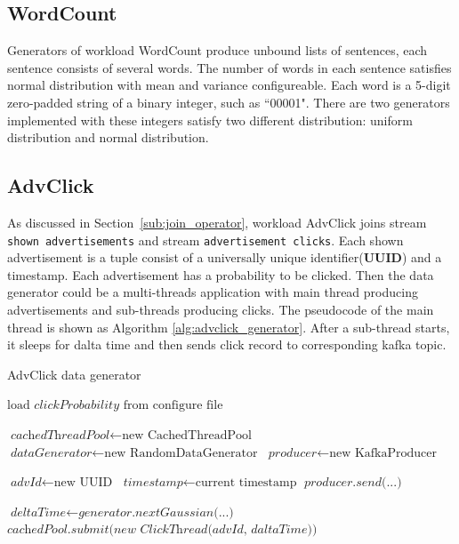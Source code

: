 \subsection{WordCount}
\label{subsection:wordcount_generator}

Generators of workload WordCount produce unbound lists of sentences, each sentence consists of several words. The number of words in each sentence satisfies normal distribution with mean and variance configureable. Each word is a 5-digit zero-padded string of a binary integer, such as ``00001". There are two generators implemented with these integers satisfy two different distribution: uniform distribution and normal distribution.

\subsection{AdvClick}

As discussed in Section~\ref{sub:join_operator}, workload AdvClick joins stream \texttt{shown advertisements} and stream \texttt{advertisement clicks}. Each shown advertisement is a tuple consist of a universally unique identifier(\textbf{UUID}) and a timestamp. Each advertisement has a probability to be clicked. Then the data generator could be a multi-threads application with main thread producing advertisements and sub-threads producing clicks. The pseudocode of the main thread is shown as Algorithm \ref{alg:advclick_generator}. After a sub-thread starts, it sleeps for dalta time and then sends click record to corresponding kafka topic. 

\begin{algorithm}
\caption{AdvClick data generator}\label{euclid}
\label{alg:advclick_generator}
\begin{algorithmic}[1]
\State $\text{load } \textit{clickProbability} \text{ from configure file}$

\State $\textit{cachedThreadPool} \gets \text{new CachedThreadPool}$
\State $\textit{dataGenerator} \gets \text{new RandomDataGenerator}$ 
\State $\textit{producer} \gets \text{new KafkaProducer}$ 

\State $\textit{advId} \gets \text{new UUID}$ 
\State $\textit{timestamp} \gets \text{current timestamp}$ 
\State $\textit{producer.send(...)}$ 

\State $\textit{deltaTime} \gets \textit{generator.nextGaussian(...)}$ 
\State $\textit{cachedPool.submit(new ClickThread(advId, daltaTime))} $ 
\EndIf
\EndWhile
\end{algorithmic}
\end{algorithm}

